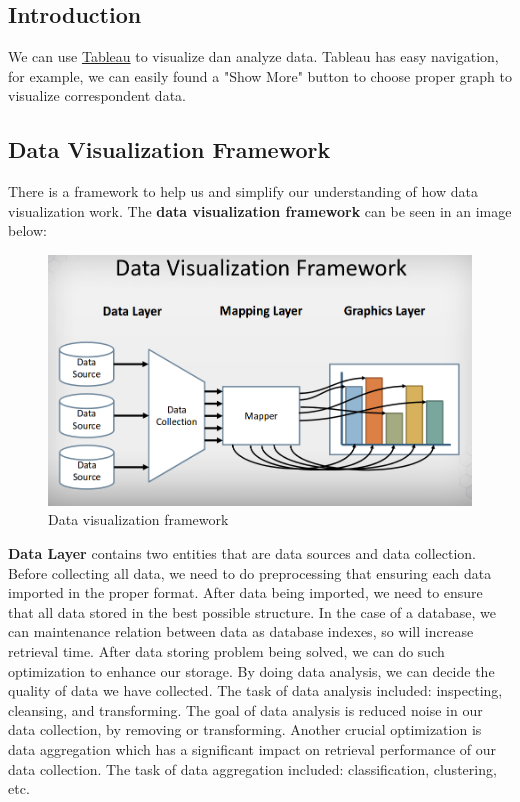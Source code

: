 \documentclass[11pt]{article}
\makeatletter
\def\maxwidth{\ifdim\Gin@nat@width>\linewidth\linewidth
    \else\Gin@nat@width\fi}
\let\Oldincludegraphics\includegraphics
\renewcommand{\includegraphics}[1]{\Oldincludegraphics[width=.8\maxwidth]{#1}}
\makeatother
\begin{document}
    \subsection{Introduction}\label{introduction}

We can use \href{https://www.tableau.com/}{Tableau} to visualize dan
analyze data. Tableau has easy navigation, for example, we can easily
found a "Show More" button to choose proper graph to visualize
correspondent data.

    \subsection{Data Visualization
Framework}\label{data-visualization-framework}

There is a framework to help us and simplify our understanding of how
data visualization work. The \textbf{data visualization framework} can
be seen in an image below:

\begin{figure}
\centering
\includegraphics{images/data-visualization-framework.png}
\caption{Data visualization framework}
\end{figure}

\textbf{Data Layer} contains two entities that are data sources and data
collection. Before collecting all data, we need to do preprocessing that
ensuring each data imported in the proper format. After data being
imported, we need to ensure that all data stored in the best possible
structure. In the case of a database, we can maintenance relation
between data as database indexes, so will increase retrieval time. After
data storing problem being solved, we can do such optimization to
enhance our storage. By doing data analysis, we can decide the quality
of data we have collected. The task of data analysis included:
inspecting, cleansing, and transforming. The goal of data analysis is
reduced noise in our data collection, by removing or transforming.
Another crucial optimization is data aggregation which has a significant
impact on retrieval performance of our data collection. The task of data
aggregation included: classification, clustering, etc.
\end{document}
